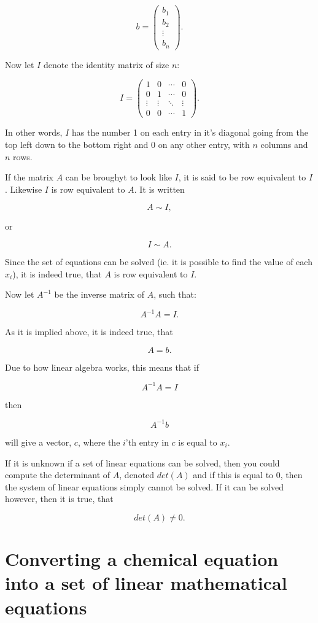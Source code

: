 \documentclass[a4paper]{article}
\begin{document}
$$b =
\begin{pmatrix}
	b_1\\
	b_2\\
	\vdots\\
	b_n
\end{pmatrix}.
$$

Now let $I$ denote the identity matrix of size $n$:

$$I =
\begin{pmatrix}
1 & 0 & \cdots & 0\\
0 & 1 & \cdots & 0\\
\vdots & \vdots & \ddots & \vdots\\
0 & 0 & \cdots & 1
\end{pmatrix}.
$$

\noindent In other words, $I$ has the number 1 on each entry in it's diagonal going from the top left down to the bottom right and 0 on any other entry, with $n$ columns and $n$ rows.

If the matrix $A$ can be broughyt to look like $I$, it is said to be row equivalent to $I$. Likewise $I$ is row equivalent to $A$. It is written

$$A \sim I,$$

\noindent or

$$I \sim A.$$

Since the set of equations can be solved (ie. it is possible to find the value of each $x_i$), it is indeed true, that $A$ is row equivalent to $I$.

Now let $A^{-1}$ be the inverse matrix of $A$, such that:

$$A^{-1} A = I.$$

As it is implied above, it is indeed true, that

$$A = b.$$

Due to how linear algebra works, this means that if

$$A^{-1} A = I$$

\noindent then

$$A^{-1} b$$

\noindent will give a vector, $c$, where the $i$'th entry in $c$ is equal to $x_i$.

If it is unknown if a set of linear equations can be solved, then you could compute the determinant of $A$, denoted $det(A)$ and if this is equal to 0, then the system of linear equations simply cannot be solved. If it can be solved however, then it is true, that

$$det(A) \neq 0.$$

\section{Converting a chemical equation into a set of linear mathematical equations}
\end{document}
